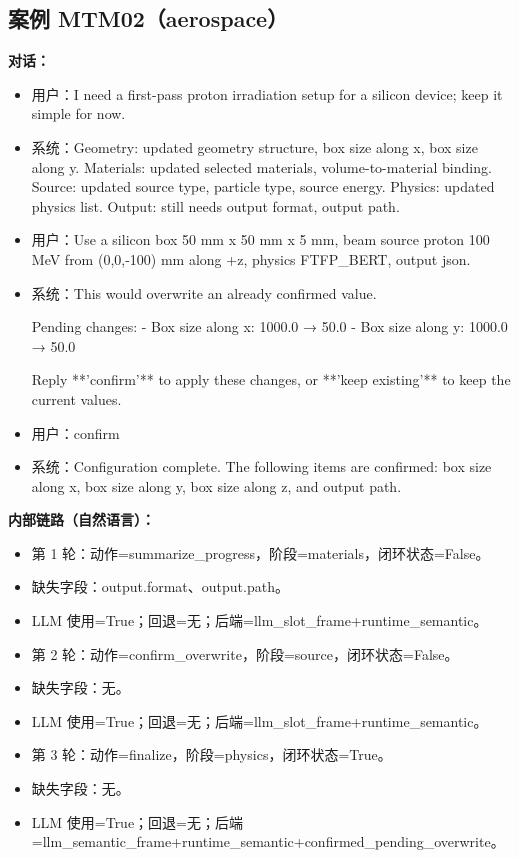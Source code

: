 \documentclass[11pt]{ctexart}
\begin{document}
\subsection{案例 MTM02（aerospace）}
\textbf{对话：}
\begin{itemize}
\item 用户：I need a first-pass proton irradiation setup for a silicon device; keep it simple for now.
\item 系统：Geometry: updated geometry structure, box size along x, box size along y. Materials: updated selected materials, volume-to-material binding. Source: updated source type, particle type, source energy. Physics: updated physics list. Output: still needs output format, output path.
\item 用户：Use a silicon box 50 mm x 50 mm x 5 mm, beam source proton 100 MeV from (0,0,-100) mm along +z, physics FTFP\_BERT, output json.
\item 系统：This would overwrite an already confirmed value.

Pending changes:
- Box size along x: 1000.0 → 50.0
- Box size along y: 1000.0 → 50.0

Reply **'confirm'** to apply these changes, or **'keep existing'** to keep the current values.
\item 用户：confirm
\item 系统：Configuration complete. The following items are confirmed: box size along x, box size along y, box size along z, and output path.
\end{itemize}
\textbf{内部链路（自然语言）：}
\begin{itemize}
\item 第 1 轮：动作=summarize\_progress，阶段=materials，闭环状态=False。
\item 缺失字段：output.format、output.path。
\item LLM 使用=True；回退=无；后端=llm\_slot\_frame+runtime\_semantic。
\item 第 2 轮：动作=confirm\_overwrite，阶段=source，闭环状态=False。
\item 缺失字段：无。
\item LLM 使用=True；回退=无；后端=llm\_slot\_frame+runtime\_semantic。
\item 第 3 轮：动作=finalize，阶段=physics，闭环状态=True。
\item 缺失字段：无。
\item LLM 使用=True；回退=无；后端=llm\_semantic\_frame+runtime\_semantic+confirmed\_pending\_overwrite。
\end{itemize}
\end{document}
